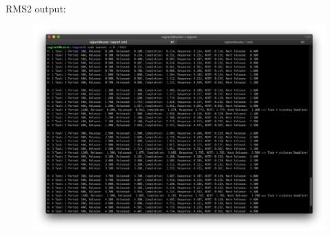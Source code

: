 \begin{enumerate}[label=\textbf{\arabic*})]
RMS2 output:
\begin{figure}[H]
        \includegraphics[width=\linewidth]{4-rms2-output}
\end{figure}
\end{enumerate}
